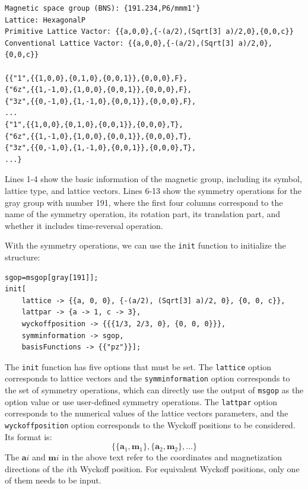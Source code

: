 \documentclass[titlepage,a4paper,12pt,AutoFakeBold]{article}
\begin{document}
\begin{lstlisting}
Magnetic space group (BNS): {191.234,P6/mmm1'}
Lattice: HexagonalP
Primitive Lattice Vactor: {{a,0,0},{-(a/2),(Sqrt[3] a)/2,0},{0,0,c}}
Conventional Lattice Vactor: {{a,0,0},{-(a/2),(Sqrt[3] a)/2,0},{0,0,c}}

{{"1",{{1,0,0},{0,1,0},{0,0,1}},{0,0,0},F},
{"6z",{{1,-1,0},{1,0,0},{0,0,1}},{0,0,0},F},
{"3z",{{0,-1,0},{1,-1,0},{0,0,1}},{0,0,0},F},
...
{"1",{{1,0,0},{0,1,0},{0,0,1}},{0,0,0},T},
{"6z",{{1,-1,0},{1,0,0},{0,0,1}},{0,0,0},T},
{"3z",{{0,-1,0},{1,-1,0},{0,0,1}},{0,0,0},T},
...}
\end{lstlisting}
Lines 1-4 show the basic information of the magnetic group, including its symbol, lattice type, and lattice vectors. Lines 6-13 show the symmetry operations for the gray group with number 191, where the first four columns correspond to the name of the symmetry operation, its rotation part, its translation part, and whether it includes time-reversal operation.

With the symmetry operations, we can use the \lstinline|init| function to initialize the structure:
\begin{lstlisting}
sgop=msgop[gray[191]];
init[
	lattice -> {{a, 0, 0}, {-(a/2), (Sqrt[3] a)/2, 0}, {0, 0, c}},
	lattpar -> {a -> 1, c -> 3},
	wyckoffposition -> {{{1/3, 2/3, 0}, {0, 0, 0}}},
	symminformation -> sgop,
	basisFunctions -> {{"pz"}}];
\end{lstlisting}	
The \lstinline|init| function has five options that must be set. The \lstinline|lattice| option corresponds to lattice vectors and the \lstinline|symminformation| option corresponds to the set of symmetry operations, which can directly use the output of \lstinline|msgop| as the option value or use user-defined symmetry operations. The \lstinline|lattpar| option corresponds to the numerical values of the lattice vectors parameters, and the \lstinline|wyckoffposition| option corresponds to the Wyckoff positions to be considered. Its format is:
\[
\{\{\boldsymbol{a}_{1},\boldsymbol{m}_{1}\},\{\boldsymbol{a}_{2},\boldsymbol{m}_{2}\},...\}
\]
The $\boldsymbol{a}{i}$ and $\boldsymbol{m}{i}$ in the above text refer to the coordinates and magnetization directions of the $i$th Wyckoff position. For equivalent Wyckoff positions, only one of them needs to be input.
\end{document}
